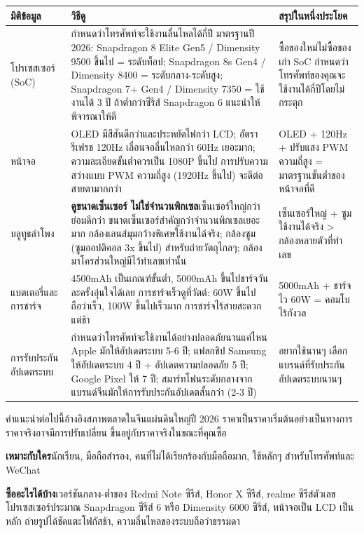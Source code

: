 \begin{center}
\begin{tabularx}{\linewidth}{|X|X|X|}
\hline
\textbf{มิติข้อมูล} & \textbf{วิธีดู} & \textbf{สรุปในหนึ่งประโยค} \tabularnewline
\hline
โปรเซสเซอร์ (SoC) & กำหนดว่าโทรศัพท์จะใช้งานลื่นไหลได้กี่ปี มาตรฐานปี 2026: Snapdragon 8 Elite Gen5 / Dimensity 9500 ขึ้นไป = ระดับท็อป; Snapdragon 8s Gen4 / Dimensity 8400 = ระดับกลาง-ระดับสูง; Snapdragon 7+ Gen4 / Dimensity 7350 = ใช้งานได้ 3 ปี ถ้าต่ำกว่าซีรีส์ Snapdragon 6 แนะนำให้พิจารณาให้ดี & ซื้อของใหม่ไม่ซื้อของเก่า SoC กำหนดว่าโทรศัพท์ของคุณจะใช้งานได้กี่ปีโดยไม่กระตุก \tabularnewline
หน้าจอ & OLED มีสีสันดีกว่าและประหยัดไฟกว่า LCD; อัตรารีเฟรช 120Hz เลื่อนจอลื่นไหลกว่า 60Hz เยอะมาก; ความละเอียดขั้นต่ำควรเป็น 1080P ขึ้นไป การปรับความสว่างแบบ PWM ความถี่สูง (1920Hz ขึ้นไป) จะดีต่อสายตามากกว่า & OLED + 120Hz + ปรับแสง PWM ความถี่สูง = มาตรฐานขั้นต่ำของหน้าจอที่ดี \tabularnewline
บลูทูธลำโพง & \textbf{ดูขนาดเซ็นเซอร์ ไม่ใช่จำนวนพิกเซล}เซ็นเซอร์ใหญ่กว่าย่อมดีกว่า ขนาดเซ็นเซอร์สำคัญกว่าจำนวนพิกเซลเยอะมาก กล้องเลนส์มุมกว้างพิเศษใช้งานได้จริง; กล้องซูม (ซูมออปติคอล 3x ขึ้นไป) สำหรับถ่ายวัตถุไกลๆ; กล้องมาโครส่วนใหญ่มีไว้ทำเลขเท่านั้น & เซ็นเซอร์ใหญ่ + ซูมใช้งานได้จริง > กล้องหลายตัวที่ทำเลข \tabularnewline
แบตเตอรี่และการชาร์จ & 4500mAh เป็นเกณฑ์ขั้นต่ำ, 5000mAh ขึ้นไปชาร์จวันละครั้งอุ่นใจได้เลย การชาร์จเร็วดูที่วัตต์: 60W ขึ้นไปถือว่าเร็ว, 100W ขึ้นไปเร็วมาก การชาร์จไร้สายสะดวกแต่ช้า & 5000mAh + ชาร์จไว 60W = คอมโบไร้กังวล \tabularnewline
การรับประกันอัปเดตระบบ & กำหนดว่าโทรศัพท์จะใช้งานได้อย่างปลอดภัยนานแค่ไหน Apple มักให้อัปเดตระบบ 5-6 ปี; แฟลกชิป Samsung ให้อัปเดตระบบ 4 ปี + อัปเดตความปลอดภัย 5 ปี; Google Pixel ให้ 7 ปี; สมาร์ทโฟนระดับกลางจากแบรนด์จีนมักให้การรับประกันอัปเดตสั้นกว่า (2-3 ปี) & อยากใช้นานๆ เลือกแบรนด์ที่รับประกันอัปเดตระบบนานๆ \tabularnewline
\hline
\end{tabularx}
\end{center}


คำแนะนำต่อไปนี้อ้างอิงสภาพตลาดในจีนแผ่นดินใหญ่ปี 2026 ราคาเป็นราคาเริ่มต้นอย่างเป็นทางการ ราคาจริงอาจมีการปรับเปลี่ยน ขึ้นอยู่กับราคาจริงในขณะที่คุณซื้อ


\textbf{เหมาะกับใคร}นักเรียน, มือถือสำรอง, คนที่ไม่ได้เรียกร้องกับมือถือมาก, ใช้หลักๆ สำหรับโทรศัพท์และ WeChat

\textbf{ซื้ออะไรได้บ้าง}เวอร์ชันกลาง-ต่ำของ Redmi Note ซีรีส์, Honor X ซีรีส์, realme ซีรีส์ตัวเลข โปรเซสเซอร์ประมาณ Snapdragon ซีรีส์ 6 หรือ Dimensity 6000 ซีรีส์, หน้าจอเป็น LCD เป็นหลัก ถ่ายรูปได้ชัดแตะโฟกัสช้า, ความลื่นไหลของระบบถือว่าธรรมดา

